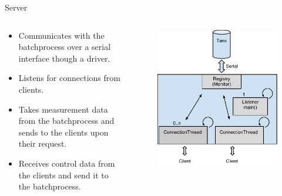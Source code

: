 \documentclass{beamer}
\begin{document}
\begin{frame}{Server}
\begin{columns}[T]
    \begin{column}{.55\textwidth}
        \begin{itemize}
            \item Communicates with the batchprocess over a serial interface though a driver.
            \item Listens for connections from clients.
            \item Takes measurement data from the batchprocess and sends to the clients upon their request.
            	\item Receives control data from the clients and send it to the batchprocess.
        \end{itemize}
    \end{column}
    \begin{column}{.45\textwidth}

        \begin{figure}[H]
           \centering
         \includegraphics[width=1\textwidth]{server_sketch.pdf}
        \end{figure}

    \end{column}
\end{columns}
\end{frame}
\end{document}
